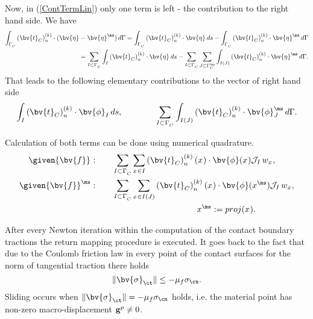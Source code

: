 
Now, in (\ref{ContTermLin}) only one term is left - the contribution to the right hand side. We have
\begin{align*} 
  \int_{\Gamma^{\sl}_C} \left(\bv{t}_{C}\right)^{(k)}_n \cdot (\bv{\eta}^{\sl} - \bv{\eta}^{\ms}) \, d\Gamma 
= \int_{\Gamma^{\sl}_C} \left(\bv{t}_{C}\right)^{(k)}_n \cdot \bv{\eta}^{\sl} \, ds
- \int_{\Gamma^{\sl}_C} \left(\bv{t}_{C}\right)^{(k)}_n \cdot \bv{\eta}^{\ms} \, d\Gamma  \\
= \sum_{I \subset \Gamma^{\sl}_C} \int_I \left(\bv{t}_{C}\right)^{(k)}_n \cdot \bv{\eta}^{\sl} \, ds
- \sum_{I \subset \Gamma^{\sl}_C} \sum_{J \subset \Gamma^{\ms}_C} 
\int_{I(J)} \left(\bv{t}_{C}\right)^{(k)}_n \cdot \bv{\eta}^{\ms} \, d\Gamma.
\end{align*}
That leads to the following elementary contributions to the vector of right hand side
\begin{equation*}
\int_I \left(\bv{t}_{C}\right)^{(k)}_n \cdot \bv{\phi}^{\sl}_I \, ds, \qquad \qquad
 \sum_{I \subset \Gamma^{\sl}_C} 
\int_{I(J)} \left(\bv{t}_{C}\right)^{(k)}_n \cdot \bv{\phi}^{\ms}_J \, d\Gamma.
\end{equation*}

Calculation of both terms can be done using numerical quadrature. 
\begin{align*}
\given{\bv{f}}^{\sl}: &\qquad \sum_{I \subset \Gamma^{\sl}_C} \sum_{x^{\sl} \in I} \left(\bv{t}_{C}\right)^{(k)}_n(x^{\sl}) \cdot \bv{\phi}(x^{\sl})
\mathcal{J}_I \, w_{x^{\sl}},\\
\given{\bv{f}}^{\ms}: &\qquad \sum_{I \subset \Gamma^{\sl}_C} \sum_{x^{\sl} \in I(J)} \left(\bv{t}_{C}\right)^{(k)}_n(x^{\sl}) \cdot \bv{\phi}(x^{\ms})
\mathcal{J}_I \, w_{x^{\sl}},\\
& \qquad \qquad \qquad \qquad \qquad \qquad x^{\ms} := proj(x^{\sl}).
\end{align*}


After every Newton iteration within the computation of the contact boundary tractions the return mapping procedure is executed. It goes back to the fact that due to the Coulomb friction law in every point of the contact surfaces for the norm of tangential traction there holds
\begin{equation*}
\Vert \bv{\sigma}_{\ct} \Vert \leq -\mu_f \sigma_{\cn}.
\end{equation*}
Sliding occurs when $\Vert \bv{\sigma}_{\ct} \Vert = - \mu_f \sigma_{\cn}$ holds, i.e. the material point has non-zero macro-displacement $\mathrm{\bf g}^p \neq 0$.

